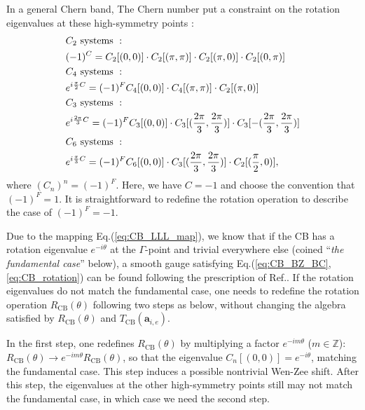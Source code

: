 \begin{subappendices}
    In a general Chern band, The Chern number put a constraint on the rotation eigenvalues at these high-symmetry points \cite{fang2012bulk}:
    \begin{align}
         & C_2 \text{ systems }:\notag                                                                                                         \\
         & (-1)^C=C_2[(0,0)]\cdot C_2[(\pi,\pi)]\cdot C_2[(\pi,0)]\cdot C_2[(0,\pi)]\notag                                                     \\
         & C_4 \text{ systems }:\notag                                                                                                         \\
         & e^{i\frac{\pi}{2}C}=(-1)^F C_4[(0,0)]\cdot C_4[(\pi,\pi)]\cdot C_2[(\pi,0)]\notag                                                   \\
         & C_3 \text{ systems }:\notag                                                                                                         \\
         & e^{i\frac{2\pi}{3}C}=(-1)^F C_3[(0,0)]\cdot C_3[(\frac{2\pi}{3},\frac{2\pi}{3})]\cdot C_3[-(\frac{2\pi}{3},\frac{2\pi}{3})]\notag   \\
         & C_6 \text{ systems }:\notag                                                                                                         \\
         & e^{i\frac{\pi}{3}C}=(-1)^F C_6[(0,0)]\cdot C_3[(\frac{2\pi}{3},\frac{2\pi}{3})]\cdot C_2[(\frac{\pi}{2},0)],\label{eq:C_constraint}
    \end{align}
    where $(C_n)^n=(-1)^F$. Here, we have $C=-1$ and choose the convention that $(-1)^F=1$. It is straightforward to redefine the rotation operation to describe the case of $(-1)^F=-1$.

    Due to the mapping Eq.(\ref{eq:CB_LLL_map}), we know that if the CB has a rotation eigenvalue $e^{-i\theta}$ at the $\Gamma$-point and trivial everywhere else (coined ``\emph{the fundamental case}'' below), a smooth gauge satisfying Eq.(\ref{eq:CB_BZ_BC},\ref{eq:CB_rotation}) can be found following the prescription of Ref.\cite{jian2013crystal}. If the rotation eigenvalues do not match the fundamental case, one needs to redefine the rotation operation $R_{\text{CB}}(\theta)$ following two steps as below, without changing the algebra satisfied by $R_{\text{CB}}(\theta)$ and $T_{\text{CB}}(\mathbf a_{i,e})$.

    In the first step, one redefines $R_{\text{CB}}(\theta)$ by multiplying a factor $e^{-im\theta}$ ($m\in\mathbb Z$): $R_{\text{CB}}(\theta)\rightarrow e^{-im\theta}R_{\text{CB}}(\theta)$, so that the eigenvalue $C_n[(0,0)]=e^{-i\theta}$, matching the fundamental case. This step induces a possible nontrivial Wen-Zee shift. After this step, the eigenvalues at the other high-symmetry points still may not match the fundamental case, in which case we need the second step.


\end{subappendices}
